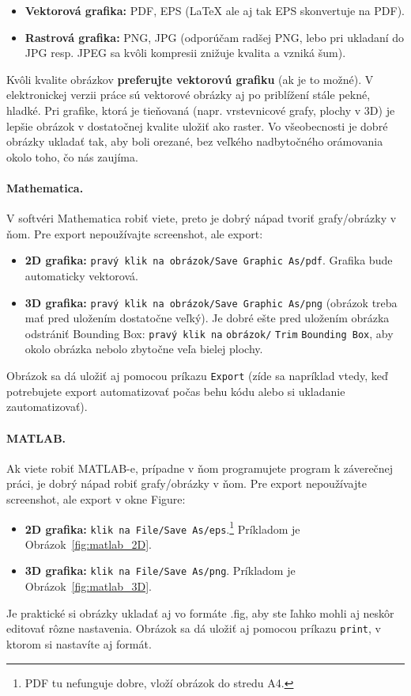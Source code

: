 \begin{itemize}
	\item \textbf{Vektorová grafika:} PDF, EPS (LaTeX ale aj tak EPS skonvertuje na PDF).
	\item \textbf{Rastrová grafika:} PNG, JPG (odporúčam radšej PNG, lebo pri ukladaní do JPG resp. JPEG sa kvôli kompresii znižuje kvalita a vzniká šum).
\end{itemize}
Kvôli kvalite obrázkov \textbf{preferujte vektorovú grafiku} (ak je to možné). V elektronickej verzii práce sú vektorové obrázky aj po priblížení stále pekné, hladké. Pri grafike, ktorá je tieňovaná (napr. vrstevnicové grafy, plochy v 3D) je lepšie obrázok v dostatočnej kvalite uložiť ako raster. Vo všeobecnosti je dobré obrázky ukladať tak, aby boli orezané, bez veľkého nadbytočného orámovania okolo toho, čo nás zaujíma.


\paragraph{Mathematica.}

V softvéri Mathematica robiť viete, preto je dobrý nápad tvoriť grafy/obrázky v ňom. Pre export nepoužívajte screenshot, ale export:
\begin{itemize}
	\item \textbf{2D grafika:} \verb|pravý klik na obrázok/Save Graphic As/pdf|. Grafika bude automaticky vektorová.
	\item \textbf{3D grafika:} \verb|pravý klik na obrázok/Save Graphic As/png| (obrázok treba mať pred uložením dostatočne veľký). Je dobré ešte pred uložením obrázka odstrániť Bounding Box: \verb|pravý klik na| \verb|obrázok/| \verb|Trim| \verb|Bounding Box|, aby okolo obrázka nebolo zbytočne veľa bielej plochy.
\end{itemize}
Obrázok sa dá uložiť aj pomocou príkazu \verb|Export| (zíde sa napríklad vtedy, keď potrebujete export automatizovať počas behu kódu alebo si ukladanie zautomatizovať).


\paragraph{MATLAB.}

Ak viete robiť MATLAB-e, prípadne v ňom programujete program k záverečnej práci, je dobrý nápad robiť grafy/obrázky v ňom. Pre export nepoužívajte screenshot, ale export v okne Figure:
\begin{itemize}
	\item \textbf{2D grafika:} \verb|klik na File/Save As/eps|.\footnote{PDF tu nefunguje dobre, vloží obrázok do stredu A4.} Príkladom je Obrázok~\ref{fig:matlab_2D}.
	\item \textbf{3D grafika:} \verb|klik na File/Save As/png|. Príkladom je Obrázok~\ref{fig:matlab_3D}.
\end{itemize}
Je praktické si obrázky ukladať aj vo formáte .fig, aby ste ľahko mohli aj neskôr editovať rôzne nastavenia. Obrázok sa dá uložiť aj pomocou príkazu \verb|print|, v ktorom si nastavíte aj formát.


